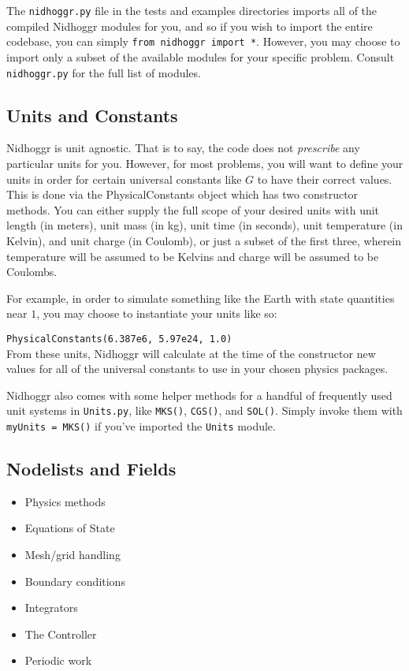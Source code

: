 \documentclass[12pt]{article}
\begin{document}
The \texttt{nidhoggr.py} file in the tests and examples directories imports all of the compiled Nidhoggr modules for you, and so if you wish to import the entire codebase, you can simply \texttt{from nidhoggr import *}. However, you may choose to import only a subset of the available modules for your specific problem. Consult \texttt{nidhoggr.py} for the full list of modules.

\subsection{Units and Constants}

Nidhoggr is unit agnostic. That is to say, the code does not \textit{prescribe} any particular units for you. However, for most problems, you will want to define your units in order for certain universal constants like $G$ to have their correct values. This is done via the PhysicalConstants object which has two constructor methods. You can either supply the full scope of your desired units with unit length (in meters), unit mass (in kg), unit time (in seconds), unit temperature (in Kelvin), and unit charge (in Coulomb), or just a subset of the first three, wherein temperature will be assumed to be Kelvins and charge will be assumed to be Coulombs. 

For example, in order to simulate something like the Earth with state quantities near $1$, you may choose to instantiate your units like so:

\texttt{PhysicalConstants(6.387e6, 5.97e24, 1.0)}
\\
From these units, Nidhoggr will calculate at the time of the constructor new values for all of the universal constants to use in your chosen physics packages.

Nidhoggr also comes with some helper methods for a handful of frequently used unit systems in \texttt{Units.py}, like \texttt{MKS()}, \texttt{CGS()}, and \texttt{SOL()}. Simply invoke them with \texttt{myUnits = MKS()} if you've imported the \texttt{Units} module.

\subsection{Nodelists and Fields}

	\begin{itemize}
		\item Physics methods
		\item Equations of State
		\item Mesh/grid handling
		\item Boundary conditions
		\item Integrators
		\item The Controller
		\item Periodic work
	\end{itemize}
\end{document}
